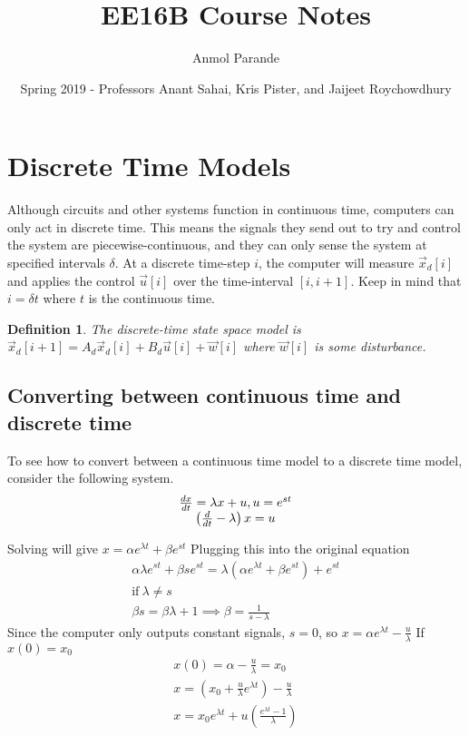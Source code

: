 \documentclass{article}
\newtheorem{definition}{Definition}
\begin{document}
\title{EE16B Course Notes}
\author{Anmol Parande}
\date{Spring 2019 - Professors Anant Sahai, Kris Pister, and Jaijeet Roychowdhury}
\maketitle
\section{Discrete Time Models}
Although circuits and other systems function in continuous time, computers can only act in discrete time.
This means the signals they send out to try and control the system are piecewise-continuous, and they can only sense the system at specified intervals $\delta$.
At a discrete time-step $i$, the computer will measure $\vec{x}_d[i]$ and applies the control $\vec{u}[i]$ over the time-interval $[i, i+1]$.
Keep in mind that $i=\delta t$ where $t$ is the continuous time.

\begin{definition}
    The discrete-time state space model is $\vec{x}_d[i+1]=A_d\vec{x}_d[i]+B_d\vec{u}[i]+\vec{w}[i]$ where $\vec{w}[i]$ is some disturbance.
\end{definition}

\subsection{Converting between continuous time and discrete time}
To see how to convert between a continuous time model to a discrete time model, consider the following system.
\[
    \begin{array}{c}
        \frac{dx}{dt}=\lambda x+u, u=e^{st}\\
        \left(
            \frac{d}{dt}-\lambda
            \right)x = u
    \end{array}\\
\]

Solving will give $x=\alpha e^{\lambda t}+\beta e^{st}$
Plugging this into the original equation
\[
    \begin{array}{c}
        \alpha \lambda e^{st}+\beta se^{st} = \lambda (\alpha e^{\lambda t}+\beta e^{st})+e^{st}\\
        \text{if}\> \lambda \ne s\\
        \beta s = \beta \lambda + 1 \implies \beta = \frac{1}{s-\lambda}
    \end{array}
    \]
Since the computer only outputs constant signals, $s=0$, so $x=\alpha e^{\lambda t}-\frac{u}{\lambda}$
If $x(0)=x_0$
\[
    \begin{array}{c}
        x(0)=\alpha - \frac{u}{\lambda}=x_0\\
        x = (x_0+\frac{u}{\lambda}e^{\lambda t})-\frac{u}{\lambda}\\
        x = x_0 e^{\lambda t}+u\left(
            \frac{e^{\lambda t}-1}{\lambda}
        \right)
    \end{array}
\]
\end{document}
